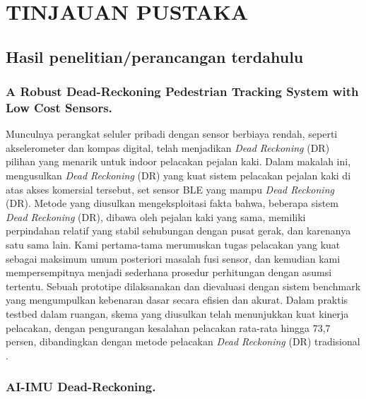 \chapter{TINJAUAN PUSTAKA}

\section{Hasil penelitian/perancangan terdahulu}

\subsection{A Robust Dead-Reckoning Pedestrian Tracking System with Low Cost Sensors.}

Munculnya perangkat seluler pribadi dengan sensor berbiaya rendah, seperti akselerometer dan kompas digital, telah menjadikan \emph{Dead Reckoning} (DR) 
pilihan yang menarik untuk indoor pelacakan pejalan kaki. Dalam makalah ini, mengusulkan \emph{Dead Reckoning} (DR) yang kuat sistem pelacakan pejalan kaki di atas akses komersial tersebut, 
set sensor BLE yang mampu \emph{Dead Reckoning} (DR). Metode yang diusulkan mengeksploitasi fakta bahwa, beberapa sistem \emph{Dead Reckoning} (DR), 
dibawa oleh pejalan kaki yang sama, memiliki perpindahan relatif yang stabil sehubungan dengan pusat gerak, dan karenanya satu sama lain. 
Kami pertama-tama merumuskan tugas pelacakan yang kuat sebagai maksimum umum posteriori masalah fusi sensor, dan kemudian kami mempersempitnya menjadi sederhana prosedur perhitungan 
dengan asumsi tertentu. Sebuah prototipe dilaksanakan dan dievaluasi dengan sistem benchmark yang mengumpulkan kebenaran dasar secara efisien dan 
akurat. Dalam praktis testbed dalam ruangan, skema yang diusulkan telah menunjukkan kuat kinerja pelacakan, dengan pengurangan kesalahan
pelacakan rata-rata hingga 73,7 persen, dibandingkan dengan metode pelacakan \emph{Dead Reckoning} (DR) tradisional \parencite{Jin2011}.

\subsection{AI-IMU Dead-Reckoning.}

